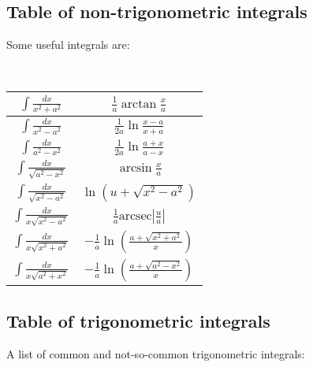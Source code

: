 \documentclass[a4paper]{amsart}
\begin{document}
\begin{multicols}{2}
    \subsection{Table of non-trigonometric integrals}
      Some useful integrals are:

      \ 
      
      \begin{tabular}{|c|c|}
        \hline 
        $\int \frac{dx}{x^2 + a^2}$ & $\frac{1}{a} \arctan \frac{x}{a}$ \\ \hline
        $\int \frac{dx}{x^2 - a^2}$ & $\frac{1}{2a} \ln \frac{x - a}{x + a}$ \\ \hline
        $\int \frac{dx}{a^2 - x^2}$ & $\frac{1}{2a} \ln \frac{a + x}{a - x}$ \\ \hline
        $\int \frac{dx}{\sqrt{a^2 - x^2}}$ & $\arcsin \frac{x}{a}$ \\ \hline
        $\int \frac{dx}{\sqrt{x^2 - a^2}}$ & $\ln \left(u + \sqrt{x^2 - a^2}\right)$ \\ \hline
        $\int \frac{dx}{x \sqrt{x^2 - a^2}}$ & $\frac{1}{a} \text{arcsec} \left| \frac{u}{a} \right|$ \\ \hline
        $\int \frac{dx}{x \sqrt{x^2 + a^2}}$ & $-\frac{1}{a} \ln \left( \frac{a + \sqrt{x^2 + a^2}}{x} \right)$ \\ \hline
        $\int \frac{dx}{x \sqrt{a^2 + x^2}}$ & $-\frac{1}{a} \ln \left( \frac{a + \sqrt{a^2 - x^2}}{x} \right)$ \\ \hline
      \end{tabular}

    \subsection{Table of trigonometric integrals}
      A list of common and not-so-common trigonometric integrals:

      \ 


\end{multicols}
\end{document}
